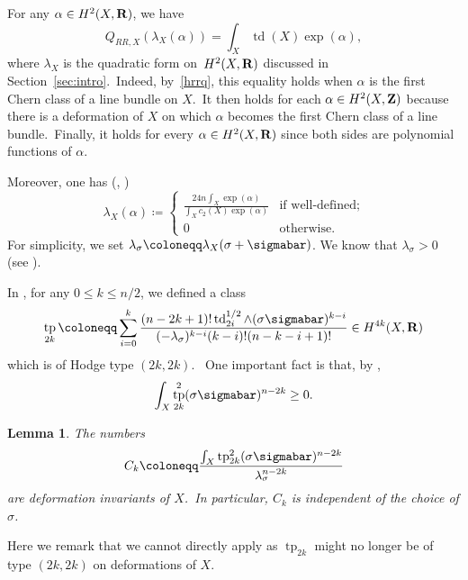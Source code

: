 \documentclass[12pt]{amsart}
\def\Z{{\bf Z}}
\def\R{{\bf R}}
\DeclareMathOperator{\td}{td}
\DeclareMathOperator{\tp}{tp}
\newtheorem{lemm}{Lemma}[section]
\theoremstyle{remark}
\begin{document}
 
  For any $\alpha\in H^2(X,\R)$, we have
\[
Q_{RR,X}(\lambda_X(\alpha))=\int_X \td(X) \exp(\alpha),
\]
where $\lambda_X$ is the quadratic form  on~$H^2(X,\R)$ discussed in Section~\ref{sec:intro}.\ Indeed, by~\eqref{hrrq}, this equality holds when $\alpha$ is the first Chern class of a line bundle on $X$.\ It then holds for each $\alpha\in H^2(X,\Z)$ because there is a deformation of $X$ on which $\alpha$ becomes the first Chern class of a line bundle.\ Finally, it holds for every $\alpha\in H^2(X,\R)$ since both sides are polynomial functions of $\alpha$.

Moreover, one has (\cite[Definition~17]{nw}, \cite[Definition~2.2]{jia})
\[ 
\lambda_X(\alpha)\coloneqq\begin{cases}\frac{24n \int_X \exp(\alpha)}{ \int_X c_{2}(X) \exp(\alpha)} & \text{if well-defined;}\\ 0 & \text{otherwise.}\end{cases} 
\]
For simplicity, we set $\lambda_\sigma\coloneqq\lambda_X(\sigma+\sigmabar)$. We know that $\lambda_\sigma>0$ (see \cite[Lemma~2.4(2)]{jia}). 

In \cite[Definition~4.1]{jia}, for any $0\leq k\leq n/2$,  
we defined a class 
\[
\tp_{2k}\coloneqq\sum_{i=0}^k\frac{(n-2k+1)!\td^{1/2}_{2i}\wedge(\sigma\sigmabar)^{k-i}}{(-\lambda_\sigma)^{k-i}(k-i)!(n-k-i+1)!}\in H^{4k}(X,\R)\] 
which is of Hodge type $(2k,2k)$.\ 
One important fact is that, by \cite[Corollary~4.4]{jia}, 
$$\int_X\tp_{2k}^2(\sigma\sigmabar)^{n-2k}\geq 0.$$

\begin{lemm}\label{lem C independent}
The numbers
\[
C_k\coloneqq\frac{\int_X\tp_{2k}^2(\sigma\sigmabar)^{n-2k}}{\lambda_{\sigma}^{n-2k}}
\]
are deformation invariants of $X$.\ In particular, $C_k$ is independent of the choice of $\sigma$.
\end{lemm}

Here we remark that we cannot directly apply \cite[Corollary~23.17]{huy} as $\tp_{2k}$ might no longer be of type $(2k,2k)$ on deformations of $X$.
\end{document}
